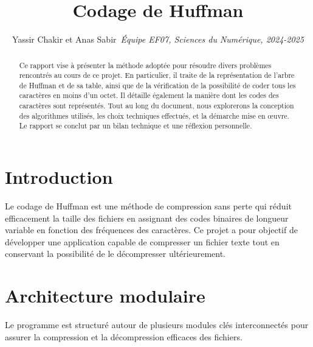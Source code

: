 \documentclass[12pt,a4paper]{article}
\title{Codage de Huffman}
\author{Yassir Chakir et Anas Sabir\
\textit{Équipe EF07, Sciences du Numérique, 2024-2025}}
\date{}
\begin{document}
\maketitle

\begin{abstract}
Ce rapport vise à présenter la méthode adoptée pour résoudre divers problèmes rencontrés au cours de ce projet. En particulier, il traite de la représentation de l'arbre de Huffman et de sa table, ainsi que de la vérification de la possibilité de coder tous les caractères en moins d'un octet. Il détaille également la manière dont les codes des caractères sont représentés. Tout au long du document, nous explorerons la conception des algorithmes utilisés, les choix techniques effectués, et la démarche mise en œuvre. Le rapport se conclut par un bilan technique et une réflexion personnelle.
\end{abstract}

\section{Introduction}
Le codage de Huffman est une méthode de compression sans perte qui réduit efficacement la taille des fichiers en assignant des codes binaires de longueur variable en fonction des fréquences des caractères. Ce projet a pour objectif de développer une application capable de compresser un fichier texte tout en conservant la possibilité de le décompresser ultérieurement.

\section{Architecture modulaire}
Le programme est structuré autour de plusieurs modules clés interconnectés pour assurer la compression et la décompression efficaces des fichiers.
\end{document}

